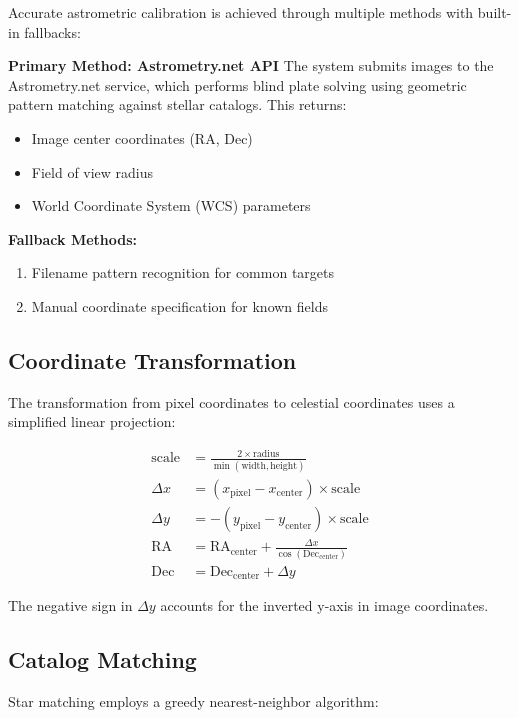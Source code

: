 \documentclass[11pt,a4paper]{article}
\begin{document}
Accurate astrometric calibration is achieved through multiple methods with built-in fallbacks:

\textbf{Primary Method: Astrometry.net API}
The system submits images to the Astrometry.net service, which performs blind plate solving using geometric pattern matching against stellar catalogs. This returns:
\begin{itemize}
    \item Image center coordinates (RA, Dec)
    \item Field of view radius
    \item World Coordinate System (WCS) parameters
\end{itemize}

\textbf{Fallback Methods:}
\begin{enumerate}
    \item Filename pattern recognition for common targets
    \item Manual coordinate specification for known fields
\end{enumerate}

\subsection{Coordinate Transformation}

The transformation from pixel coordinates to celestial coordinates uses a simplified linear projection:

\begin{align}
\text{scale} &= \frac{2 \times \text{radius}}{\min(\text{width}, \text{height})} \\
\Delta x &= (x_{\text{pixel}} - x_{\text{center}}) \times \text{scale} \\
\Delta y &= -(y_{\text{pixel}} - y_{\text{center}}) \times \text{scale} \\
\text{RA} &= \text{RA}_{\text{center}} + \frac{\Delta x}{\cos(\text{Dec}_{\text{center}})} \\
\text{Dec} &= \text{Dec}_{\text{center}} + \Delta y
\end{align}

The negative sign in $\Delta y$ accounts for the inverted y-axis in image coordinates.

\subsection{Catalog Matching}

Star matching employs a greedy nearest-neighbor algorithm:
\end{document}
